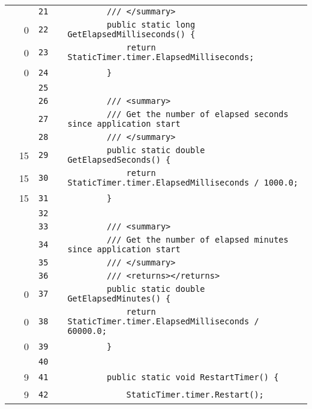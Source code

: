 \documentclass[a4paper,landscape,10pt]{article}
\begin{document}
\begin{longtable}[l]{lrrll}
\cellcolor{gray} &  & \verb~21~ & & \verb~        /// </summary>~\\
\cellcolor{red} & 0 & \verb~22~ & & \verb~        public static long GetElapsedMilliseconds() {~\\
\cellcolor{red} & 0 & \verb~23~ & & \verb~            return StaticTimer.timer.ElapsedMilliseconds;~\\
\cellcolor{red} & 0 & \verb~24~ & & \verb~        }~\\
\cellcolor{gray} &  & \verb~25~ & & \verb~~\\
\cellcolor{gray} &  & \verb~26~ & & \verb~        /// <summary>~\\
\cellcolor{gray} &  & \verb~27~ & & \verb~        /// Get the number of elapsed seconds since application start~\\
\cellcolor{gray} &  & \verb~28~ & & \verb~        /// </summary>~\\
\cellcolor{green} & 15 & \verb~29~ & & \verb~        public static double GetElapsedSeconds() {~\\
\cellcolor{green} & 15 & \verb~30~ & & \verb~            return StaticTimer.timer.ElapsedMilliseconds / 1000.0;~\\
\cellcolor{green} & 15 & \verb~31~ & & \verb~        }~\\
\cellcolor{gray} &  & \verb~32~ & & \verb~~\\
\cellcolor{gray} &  & \verb~33~ & & \verb~        /// <summary>~\\
\cellcolor{gray} &  & \verb~34~ & & \verb~        /// Get the number of elapsed minutes since application start~\\
\cellcolor{gray} &  & \verb~35~ & & \verb~        /// </summary>~\\
\cellcolor{gray} &  & \verb~36~ & & \verb~        /// <returns></returns>~\\
\cellcolor{red} & 0 & \verb~37~ & & \verb~        public static double GetElapsedMinutes() {~\\
\cellcolor{red} & 0 & \verb~38~ & & \verb~            return StaticTimer.timer.ElapsedMilliseconds / 60000.0;~\\
\cellcolor{red} & 0 & \verb~39~ & & \verb~        }~\\
\cellcolor{gray} &  & \verb~40~ & & \verb~~\\
\cellcolor{green} & 9 & \verb~41~ & & \verb~        public static void RestartTimer() {~\\
\cellcolor{green} & 9 & \verb~42~ & & \verb~            StaticTimer.timer.Restart();~\\

\end{longtable}
\end{document}
